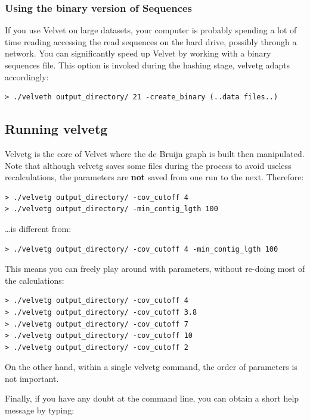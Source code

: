 \documentclass{article}
\begin{document}
\subsubsection{Using the binary version of Sequences}

If you use Velvet on large datasets, your computer is probably spending a lot of time reading accessing the read sequences on the hard drive, possibly through a network. You can significantly speed up Velvet by working with a binary sequences file. This option is invoked during the hashing stage, velvetg adapts accordingly:

\begin{verbatim}
> ./velveth output_directory/ 21 -create_binary (..data files..)
\end{verbatim}

\subsection{Running velvetg}

Velvetg is the core of Velvet where the de Bruijn graph is built then manipulated. Note that although velvetg saves some files during the process to avoid useless recalculations, the parameters are \textbf{not} saved from one run to the next. Therefore:

\begin{verbatim}
> ./velvetg output_directory/ -cov_cutoff 4
> ./velvetg output_directory/ -min_contig_lgth 100
\end{verbatim}

\ldots is different from:

\begin{verbatim}
> ./velvetg output_directory/ -cov_cutoff 4 -min_contig_lgth 100
\end{verbatim}

This means you can freely play around with parameters, without re-doing most of the calculations:

\begin{verbatim}
> ./velvetg output_directory/ -cov_cutoff 4
> ./velvetg output_directory/ -cov_cutoff 3.8
> ./velvetg output_directory/ -cov_cutoff 7
> ./velvetg output_directory/ -cov_cutoff 10
> ./velvetg output_directory/ -cov_cutoff 2
\end{verbatim}

On the other hand, within a single velvetg command, the order of parameters is not important.

Finally, if you have any doubt at the command line, you can obtain a short help message by typing:
\end{document}
